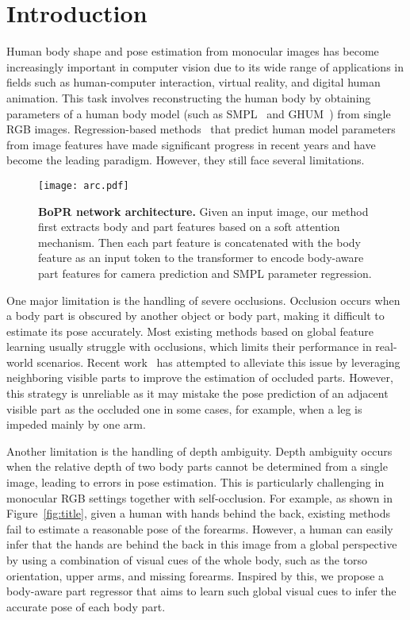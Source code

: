 \documentclass[10pt,twocolumn,letterpaper]{article}
\begin{document}
\section{Introduction}

Human body shape and pose estimation from monocular images has become increasingly important in computer vision due to its wide range of applications in fields such as human-computer interaction, virtual reality, and digital human animation. This task involves reconstructing the human body by obtaining parameters of a human body model (such as SMPL~\cite{loper2015smpl} and GHUM~\cite{xu2020ghum}) from single RGB images. Regression-based methods~\cite{guler2019holopose,kanazawa2018end,omran2018neural,pavlakos2018learning,kocabas2021spec,kocabas2021pare,li2022cliff} that predict human model parameters from image features have made significant progress in recent years and have become the leading paradigm. However, they still face several limitations.

\begin{figure*}[t]
  \begin{center}
    \texttt{[image: arc.pdf]}
  \end{center}
  \caption{\textbf{BoPR network architecture.} Given an input image, our method first extracts body and part features based on a soft attention mechanism. Then each part feature is concatenated with the body feature as an input token to the transformer to encode body-aware part features for camera prediction and SMPL parameter regression.}
  \label{fig:arc}
  \end{figure*}


One major limitation is the handling of severe occlusions. Occlusion occurs when a body part is obscured by another object or body part, making it difficult to estimate its pose accurately. Most existing methods based on global feature learning usually struggle with occlusions, which limits their performance in real-world scenarios. Recent work~\cite{kocabas2021pare} has attempted to alleviate this issue by leveraging neighboring visible parts to improve the estimation of occluded parts. However, this strategy is unreliable as it may mistake the pose prediction of an adjacent visible part as the occluded one in some cases, for example, when a leg is impeded mainly by one arm.

Another limitation is the handling of depth ambiguity. Depth ambiguity occurs when the relative depth of two body parts cannot be determined from a single image, leading to errors in pose estimation. This is particularly challenging in monocular RGB settings together with self-occlusion. For example, as shown in Figure~\ref{fig:title}, given a human with hands behind the back, existing methods fail to estimate a reasonable pose of the forearms. However, a human can easily infer that the hands are behind the back in this image from a global perspective by using a combination of visual cues of the whole body, such as the torso orientation, upper arms, and missing forearms. Inspired by this, we propose a body-aware part regressor that aims to learn such global visual cues to infer the accurate pose of each body part.
\end{document}
